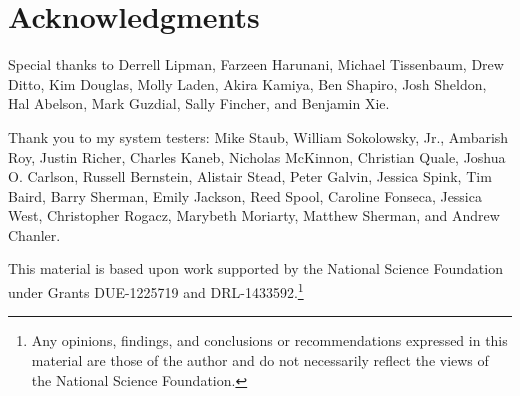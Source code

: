 \chapter*{Acknowledgments}
\renewcommand{\thefootnote}{\fnsymbol{footnote}}


Special thanks to Derrell Lipman, Farzeen Harunani, Michael Tissenbaum, Drew Ditto, Kim Douglas, Molly Laden, Akira Kamiya, Ben Shapiro, Josh Sheldon, Hal Abelson, Mark Guzdial, Sally Fincher, and Benjamin Xie.

Thank you to my system testers: Mike Staub, William Sokolowsky, Jr., Ambarish Roy, Justin Richer, Charles Kaneb, Nicholas McKinnon, Christian Quale, Joshua O. Carlson, Russell Bernstein, Alistair Stead, Peter Galvin, Jessica Spink, Tim Baird, Barry Sherman, Emily Jackson, Reed Spool, Caroline Fonseca, Jessica West, Christopher Rogacz, Marybeth Moriarty, Matthew Sherman, and Andrew Chanler.


This material is based upon work supported by the National Science Foundation under Grants DUE-1225719 and DRL-1433592.\footnote{Any opinions, findings, and conclusions or recommendations expressed in this material are those of the author and do not necessarily reflect the views of the National Science Foundation.}

\renewcommand{\thefootnote}{\arabic{footnote}}